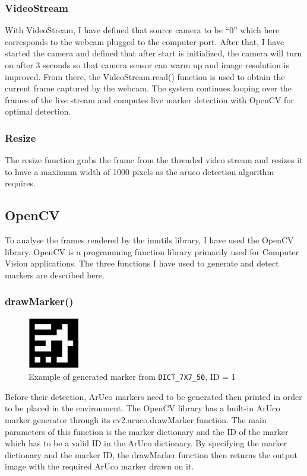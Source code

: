 \documentclass[oneside,%
                    author={Malak Hajji},
                    degree={BSc},
                    title={Designing An Accessible Ozobot Programming Platform for Students},
                  subtitle={With Mixed Visual Abilities}]{dissertation}
\begin{document}
\subsubsection{VideoStream}
With VideoStream, I have defined that source camera to be “0” which here corresponds to the webcam plugged to the computer port. After that, I have started the camera and defined that after start is initialized, the camera will turn on after 3 seconds so that camera sensor can warm up and image resolution is improved. From there, the VideoStream.read() function is used to obtain the current frame captured by the webcam. The system continues looping over the frames of the live stream and computes live marker detection with OpenCV for optimal detection.

\subsubsection{Resize}
The resize function grabs the frame from the threaded video stream and resizes it to have a maximum width of 1000 pixels as the aruco detection algorithm requires.

\subsection{OpenCV}
To analyse the frames rendered by the imutils library, I have used the OpenCV library. OpenCV is a programming function library primarily used for Computer Vision applications. The three functions I have used to generate and detect markers are described here. 

\subsubsection{drawMarker()}
\FloatBarrier
\begin{figure}[h]
    \centering
    \includegraphics[width=0.2\textwidth]{thesis/marker.eps}
    \caption{Example of generated marker from  \texttt{DICT\_7X7\_50}, ID = 1}
    \label{fig-marker}
\end{figure}
\FloatBarrier
Before their detection, ArUco markers need to be generated then printed in order to be placed in the environment. The OpenCV library has a built-in ArUco marker generator through its cv2.aruco.drawMarker function. The main parameters of this function is the marker dictionary and the ID of the marker which has to be a valid ID in the ArUco dictionary. By specifying the marker dictionary and the marker ID, the drawMarker function then returns the output image with the required ArUco marker drawn on it. 
\end{document}

